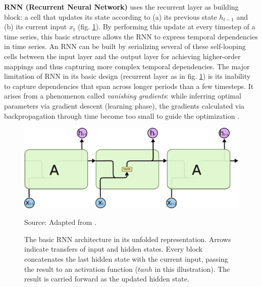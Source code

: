 \vspace{1em}
\noindent
\textbf{RNN (Recurrent Neural Network)} uses the recurrent layer as building block: a cell that updates its state according to (a) its previous state $h_{t-1}$ and (b) its current input $x_t$ (fig. \ref{fig:rnn}). By performing this update at every timestep of a time series, this basic structure allows the RNN to express temporal dependencies in time series. An RNN can be built by serializing several of these self-looping cells between the input layer and the output layer for achieving higher-order mappings and thus capturing more complex temporal dependencies.
The major limitation of RNN in its basic design (recurrent layer as in fig. \ref{fig:rnn}) is its inability to capture dependencies that span across longer periods than a few timesteps.
It arises from a phenomenon called \textit{vanishing gradients}: while inferring optimal parameters via gradient descent (learning phase), the gradients calculated via backpropagation through time become too small to guide the optimization \cite{paneru2015lstm}.
\begin{figure}[H]
   \centering
    \caption{The basic RNN architecture in its unfolded representation. Arrows indicate transfers of input and hidden states. Every block concatenates the last hidden state with the current input, passing the result to an activation function ($tanh$ in this illustration). The result is carried forward as the updated hidden state.}
    \includegraphics[scale=0.45]{rnn.png}  \\
    \raggedright
    Source: Adapted from \cite{paneru2015lstm}.
   \label{fig:rnn}
\end{figure}

